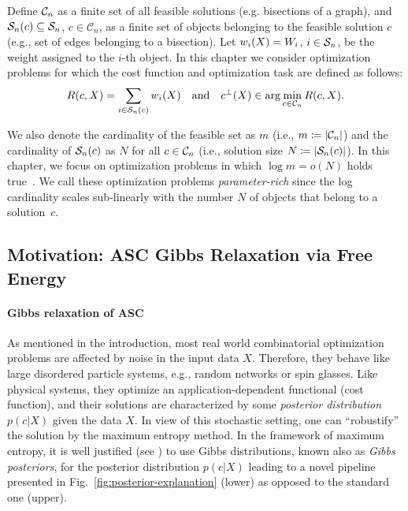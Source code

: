 %
%
%
%
%
Define $\C_n$ as a finite set of all feasible solutions (e.g.
bisections of a graph), and $\S_n(c) \subseteq \S_n$,
$c\in\mathcal{C}_n$, as a finite set of objects belonging to the
feasible solution $c$ (e.g., set of edges belonging to a bisection).
Let $w_i(\data) = W_i$, $i \in \S_n$, be the weight assigned to the
$i$-th object. In this chapter we consider optimization problems for which the cost
function and optimization task are defined as follows:
\begin{equation}
  \label{eq:cost_function_erm}
  R(c, X) = \sum_{{i} \in \S_n ( c )} w_i ( \data )\quad \text{and} \quad
  c^\bot(X) \in \arg \min_{c \in \C_n} R(c, X).
\end{equation}

%
%
We also denote the cardinality of the feasible set as $m$
(i.e., $m \coloneqq |\C_n|$) and the cardinality of $\S_n(c)$ as $N$ for all $c
\in \C_n$ (i.e., solution size $N \coloneqq |\S_n(c)|$). In this chapter, we
focus on optimization problems in which $\log m=o(N)$ holds
true~\citep[see][]{ws95optimization}.%
We call these optimization problems \emph{parameter-rich} since the
log cardinality scales sub-linearly with the number $N$ of objects that
belong to a solution~$c$.

\subsection{Motivation: ASC Gibbs Relaxation via Free Energy}
\label{sec:free_boltzmann-distr-validation}

\paragraph{Gibbs relaxation of ASC} As mentioned in the introduction, most real
world combinatorial optimization problems are affected by noise in the input
data $X$. Therefore, they behave like large disordered particle systems, e.g.,
random networks or spin glasses. Like physical systems, they optimize an
application-dependent functional (cost function), and their solutions are
characterized by some \textit{posterior
distribution} $p(c|X)$ given the data $X$. In view of this stochastic setting,
one can ``robustify'' the solution by the maximum entropy method.  In the framework of maximum entropy, it is well
justified (see \citet{mezard84tsp}) to use Gibbs distributions, known also as
\textit{Gibbs posteriors}, for the posterior distribution $p(c|X)$ leading to a
novel pipeline presented in Fig.~\ref{fig:posterior-explanation} (lower) as
opposed to the standard one (upper).


